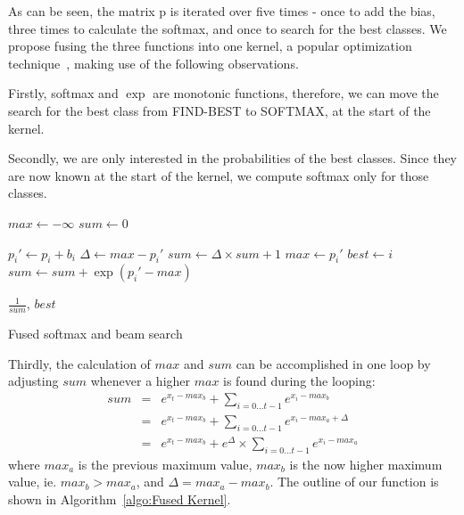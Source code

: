 \documentclass[11pt,a4paper]{article}
\begin{document}
As can be seen, the matrix p is iterated over five times - once to add the bias, three times to calculate the softmax, and once to search for the best classes. We propose fusing the three functions into one kernel, a popular optimization technique~\citep{Guevara2009EnablingTP}, making use of the following observations.

Firstly, softmax and $\exp$ are monotonic functions, therefore, we can move the search for the best class from FIND-BEST to SOFTMAX, at the start of the kernel.

Secondly, we are only interested in the probabilities of the best classes. Since they are now known at the start of the kernel, we compute softmax only for those classes.

\begin{algorithm}
\begin{algorithmic}


\State $max \gets - \infty$ 
\State $sum \gets 0$ 

  \State $p_i' \gets p_i + b_i$  
    \State $\Delta \gets max - p_i'$
    \State $sum \gets \Delta \times sum + 1 $
    \State $max \gets p_i'$
    \State $best \gets i$
  \Else
    \State $sum \gets sum + \exp(p_i' - max)$
  \EndIf
\EndFor

\Return $\frac{1}{sum}$, $best$ 

\EndProcedure
\end{algorithmic}

\caption{Fused softmax and beam search}
\label{algo:Fused Kernel}
\end{algorithm}

Thirdly, the calculation of $max$ and $sum$ can be accomplished in one loop by adjusting $sum$ whenever a higher $max$ is found during the looping:
\begin{eqnarray*}
sum & = & e^{x_t - max_b} + \sum_{i=0...t-1}{e^{x_i - max_b}} \\
    & = & e^{x_t - max_b} + \sum_{i=0...t-1}{e^{x_i - max_a + \Delta}}  \\
    & = & e^{x_t - max_b} + e^{\Delta} \times \sum_{i=0...t-1}{e^{x_i - max_a}} 
\end{eqnarray*}
where $max_a$ is the previous
maximum value, $max_b$ is the now higher maximum value, ie. $max_b > max_a$, and $\Delta = max_a - max_b$. The outline of our function is shown in Algorithm~\ref{algo:Fused Kernel}.
\end{document}
